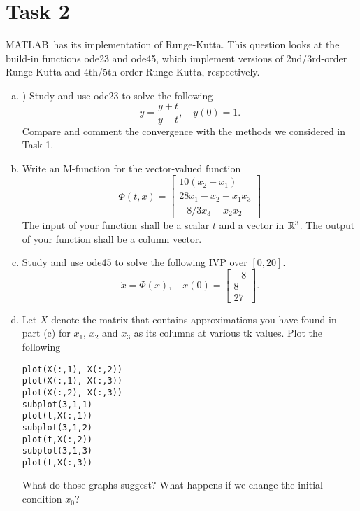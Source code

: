 \section*{Task 2}
MATLAB\texttrademark\ has its implementation of Runge-Kutta.
This question looks at the build-in functions {\color{blue}ode23} and {\color{blue}ode45}, which implement versions of 2nd/3rd-order Runge-Kutta and 4th/5th-order Runge Kutta, respectively.
\begin{enumerate}[(a)]
	\item ) Study and use {\color{blue}ode23} to solve the following
	\[ \dot{y}=\frac{y+t}{y-t}, \quad y(0)=1. \]
	Compare and comment the convergence with the methods we considered in Task 1.
	\item Write an M-function for the vector-valued function
	\[ \Phi(t,x)=\begin{bmatrix} 10(x_2-x_1) \\ 28x_1-x_2-x_1x_3 \\ -8/3x_3+x_2x_2 \end{bmatrix} \]
	The input of your function shall be a scalar \(t\) and a vector in \(\mathbb{R}^3\).
	The output of your function shall be a column vector.
	\item  Study and use {\color{blue}ode45} to solve the following IVP over \([0, 20]\).
	\[ \dot{x}=\Phi(x), \quad x(0)=\begin{bmatrix} -8 \\ 8 \\ 27 \end{bmatrix}. \]
	\item Let \(X\) denote the matrix that contains approximations you have found in part (c) for \(x_1\), \(x_2\) and \(x_3\) as its columns at various tk values.
	Plot the following
	\begin{lstlisting}[style=Matlab-editor]
plot(X(:,1), X(:,2))
plot(X(:,1), X(:,3))
plot(X(:,2), X(:,3))
subplot(3,1,1)
plot(t,X(:,1))
subplot(3,1,2)
plot(t,X(:,2))
subplot(3,1,3)
plot(t,X(:,3))
	\end{lstlisting}
	What do those graphs suggest?
	What happens if we change the initial condition \(x_0\)?
\end{enumerate}


